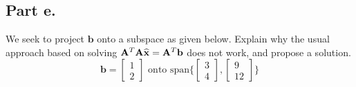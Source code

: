 \subsection{Part e.}
We seek to project $\mathbf{b}$ onto a subspace as given below. Explain why
the usual approach based on solving $\mathbf{A}^{T} \mathbf{A} \widehat{\mathbf{x}} =
\mathbf{A}^{T} \mathbf{b}$ does not work, and propose a solution.
\begin{equation}
    \mathbf{b} =
    \begin{bmatrix}
        1   \\
        2
    \end{bmatrix}
    \text{ onto span}
    \Bigg\{
        \begin{bmatrix}
            3   \\
            4
        \end{bmatrix}
        ,
        \begin{bmatrix}
            9   \\
            12
        \end{bmatrix}
        \Bigg\}
\end{equation}
